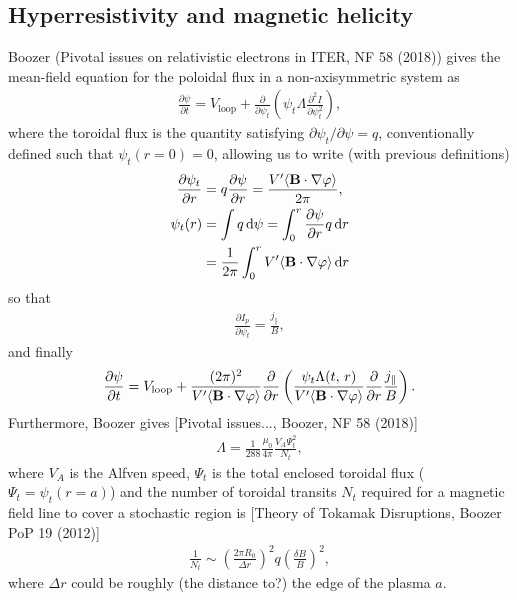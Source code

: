 \documentclass[11pt,a4paper]{article}
\newcommand{\rd}{\ensuremath{\mathrm{d}}}
\newcommand{\sub}[1]{\ensuremath{_{\text{#1}}}}
\renewcommand{\b}[1]{\ensuremath{ {\bf #1 } }}
\begin{document}
\subsection{Hyperresistivity and magnetic helicity}
Boozer (Pivotal issues on relativistic electrons in ITER, NF 58 (2018)) gives the mean-field equation for the poloidal flux in a non-axisymmetric system as
\begin{align}
\frac{\partial \psi}{\partial t} = V\sub{loop} + \frac{\partial}{\partial \psi_t}\left(\psi_t \Lambda \frac{\partial^2 I}{\partial \psi_t^2}\right),
\end{align}
where the toroidal flux is the quantity satisfying $\partial \psi_t/\partial \psi = q$, conventionally defined such that $\psi_t(r=0) = 0$, allowing us to write (with previous definitions) 
\begin{align}
\frac{\partial \psi_t}{\partial r} &= q\frac{\partial \psi}{\partial r} = \frac{V'\langle \b{B}\cdot\nabla\varphi \rangle}{2\pi}, \nonumber \\
\psi_t(r) &= \int q \,\rd \psi = \int_0^r \frac{\partial \psi}{\partial r}q\,\rd r \nonumber \\
&= \frac{1}{2\pi} \int_0^r V'\langle \b{B}\cdot\nabla\varphi\rangle\,\rd r
\end{align}
so that
\begin{align}
\frac{\partial I_p}{\partial \psi_t} = \frac{j_\parallel}{B},
\end{align}
and finally 
\begin{align}
\frac{\partial \psi}{\partial t} = V\sub{loop} + \frac{(2\pi)^2}{ V'\langle \b{B}\cdot\nabla\varphi\rangle}\frac{\partial}{\partial r}\left( \frac{\psi_t\Lambda(t,\,r)}{V'\langle \b{B}\cdot\nabla\varphi\rangle}  \frac{\partial}{\partial r}\frac{j_\parallel}{B}\right).
\end{align}
Furthermore, Boozer gives [Pivotal issues..., Boozer, NF 58 (2018)]
\begin{align}
\Lambda = \frac{1}{288} \frac{\mu_0}{4\pi}\frac{V_A \Psi_t^2}{N_t},
\end{align}
where $V_A$ is the Alfven speed, $\Psi_t$ is the total enclosed toroidal flux ($\Psi_t = \psi_t(r=a)$) and the number of toroidal transits $N_t$ required for a magnetic field line to cover a stochastic region is [Theory of Tokamak Disruptions, Boozer PoP 19 (2012)]
\begin{align}
\frac{1}{N_t} \sim \left(\frac{2\pi R_0}{\Delta r}\right)^2 q \left(\frac{\delta B}{B}\right)^2,
\end{align}
where $\Delta r$ could be roughly (the distance to?) the edge of the plasma $a$.
\end{document}
